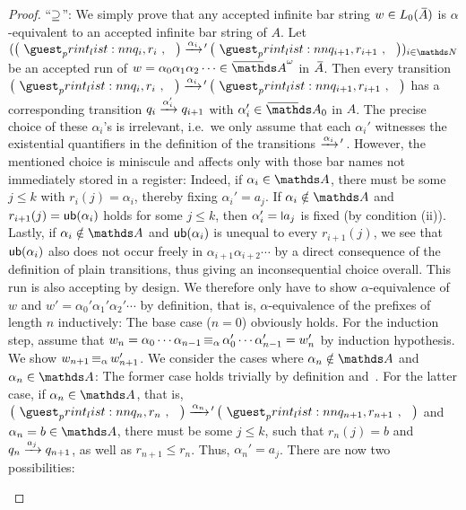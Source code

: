 \documentclass[a4paper,UKenglish,cleveref,autoref,thm-restate,numberwithinsect,final]{lipics-v2021}
\begin{document}
\begin{proof}
      \noindent\enquote{$\supseteq$}: We simply prove that any accepted infinite bar string $w \in L_0(\barA)$ is
      $\alpha$-equivalent to an accepted infinite bar string of $A$.
      Let $(\maketuple{q_i, r_i} \xra{\alpha_i}\!'{}\, \maketuple{q_{i + 1}, r_{i + 1}})_{i \in \Nat}$ be an accepted
      run of $w = \alpha_0\alpha_1\alpha_2\cdots \in \barAw$ in $\barA$.
      Then every transition $\maketuple{q_i, r_i} \xra{\alpha_i}\!'{}\, \maketuple{q_{i + 1}, r_{i + 1}}$ has a
      corresponding transition $q_i \xrightarrow{\alpha_i'} q_{i + 1}$ with $\alpha_i' \in \barNames_0$ in $A$.
      The precise choice of these $\alpha_i$'s is irrelevant, i.e.~we only assume that each $\alpha_i'$ witnesses
      the existential quantifiers in the definition of the transitions $\xrightarrow{\alpha_i}\!'{}\,$. However, the mentioned
      choice is miniscule and affects only with those bar names not immediately stored in a register: Indeed, if
      $\alpha_i \in \names$, there must be some $j \leqslant k$ with $r_i(j) = \alpha_i$, thereby fixing $\alpha_i' =
      a_j$. If $\alpha_i \notin\names$ and $r_{i + 1}(j) = {\mathsf{ub}}(\alpha_i)$ holds for some $j \leqslant k$, then
      $\alpha_i' = \newletter{a_j}$ is fixed (by condition (ii)). Lastly, if $\alpha_i \notin\names$ and ${\mathsf{ub}}(\alpha_i)$
      is unequal to every $r_{i + 1}(j)$, we see that ${\mathsf{ub}}(\alpha_i)$ also does not occur freely in
      $\alpha_{i + 1}\alpha_{i + 2} \cdots$ by a direct consequence of the definition of plain transitions, thus giving
      an inconsequential choice overall.
      This run is also accepting by design. We therefore only have to show
      $\alpha$-equivalence of $w$ and $w' = \alpha_0'\alpha_1'\alpha_2'\cdots$ by definition, that is,
      $\alpha$-equivalence of the prefixes of length $n$ inductively:
      The base case ($n = 0$) obviously holds. For the induction step, assume that $w_n = \alpha_0\cdots\alpha_{n-1}
      \operatorname{\equiv_{\alpha}} \alpha_0'\cdots\alpha_{n-1}' = w_n'$ by induction hypothesis. We show $w_{n + 1} \operatorname{\equiv_{\alpha}}
      w'_{n + 1}$. We consider the cases where $\alpha_n \notin\names$ and $\alpha_n \in \names$: The former case
      holds trivially by definition and~. For the latter case, if $\alpha_n \in \names$, that is,
      $\maketuple{q_n, r_n} \xra{\alpha_n}\!'{}\, \maketuple{q_{n + 1}, r_{n + 1}}$ and $\alpha_n = b \in \names$, there
      must be some $j \leqslant k$, such that $r_n(j) = b$ and $q_n \xrightarrow{a_j} q_{n + 1}$, as well as $r_{n + 1}
      \leqslant r_n$. Thus, $\alpha_n' = a_j$. There are now two possibilities:
      \begin{enumerate}

\end{enumerate}
\end{proof}
\end{document}
